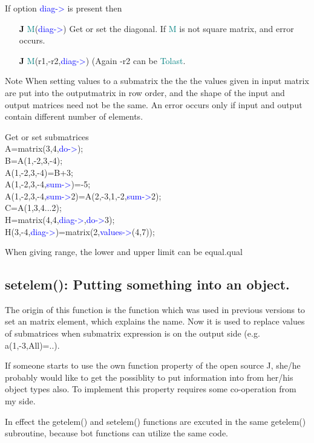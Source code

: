 If option \textcolor{blue}{diag->} is present then
\begin{itemize}
\item[\textbf{J}\.] \textcolor{teal}{M}(\textcolor{blue}{diag->}) Get or set the diagonal. If \textcolor{teal}{M} is not square matrix, and error
occurs.
\item[\textbf{J}\.] \textcolor{teal}{M}(r1,-r2,\textcolor{blue}{diag->}) (Again -r2 can be \textcolor{teal}{Tolast}.
\end{itemize}
\begin{note}
Note
When setting values to a submatrix the the the values given in input matrix
are put into the outputmatrix in row order, and the shape of the input and output matrices need
not be the same. An error occurs only if input and output contain different number of
elements.
\end{note}
\begin{example}[getset]Get or set submatrices\\
\label{getset}
A=\textcolor{VioletRed}{matrix}(3,4,\textcolor{blue}{do->});\\
B=A(1,-2,3,-4);\\
A(1,-2,3,-4)=B+3;\\
A(1,-2,3,-4,\textcolor{blue}{sum->})=-5;\\
A(1,-2,3,-4,\textcolor{blue}{sum->}2)=A(2,-3,1,-2,\textcolor{blue}{sum->}2);\\
C=A({1,3},{4...2});\\
H=\textcolor{VioletRed}{matrix}(4,4,\textcolor{blue}{diag->},\textcolor{blue}{do->}3);\\
H(3,-4,\textcolor{blue}{diag->})=\textcolor{VioletRed}{matrix}(2,\textcolor{blue}{values->}(4,7));
\end{example}
\begin{note}
When giving range, the lower and upper limit can be equal.qual
\end{note}
\subsection{\textcolor{VioletRed}{setelem}(): Putting something  into an object.}
\label{setelem}
The origin of this function is the function which was used in previous versions
to set an matrix element, which explains the name. Now it is used to replace values
of submatrices when submatrix expression is on the
output side (e.g. a(1,-3,All)=..).
\begin{note}
If someone starts to use the own function property of the open source J, she/he
probably would like to get the possiblity to put information into from her/his object types
also. To implement this property requires some co-operation from my side.
\end{note}
\begin{note}
In effect the \textcolor{VioletRed}{getelem}() and \textcolor{VioletRed}{setelem}() functions are excuted in the same
\textcolor{VioletRed}{getelem}() subroutine, because bot functions can utilize the same code.
\end{note}
